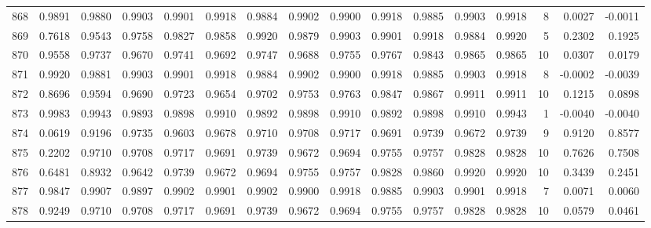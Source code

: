\begin{tabular}{lrrrrrrrrrrrrrrr}
868 &      0.9891 &  0.9880 &  0.9903 &  0.9901 &  0.9918 &  0.9884 &  0.9902 &  0.9900 &  0.9918 &  0.9885 &   0.9903 &     0.9918 &      8 &                    0.0027 &                    -0.0011 \\
869 &      0.7618 &  0.9543 &  0.9758 &  0.9827 &  0.9858 &  0.9920 &  0.9879 &  0.9903 &  0.9901 &  0.9918 &   0.9884 &     0.9920 &      5 &                    0.2302 &                     0.1925 \\
870 &      0.9558 &  0.9737 &  0.9670 &  0.9741 &  0.9692 &  0.9747 &  0.9688 &  0.9755 &  0.9767 &  0.9843 &   0.9865 &     0.9865 &     10 &                    0.0307 &                     0.0179 \\
871 &      0.9920 &  0.9881 &  0.9903 &  0.9901 &  0.9918 &  0.9884 &  0.9902 &  0.9900 &  0.9918 &  0.9885 &   0.9903 &     0.9918 &      8 &                   -0.0002 &                    -0.0039 \\
872 &      0.8696 &  0.9594 &  0.9690 &  0.9723 &  0.9654 &  0.9702 &  0.9753 &  0.9763 &  0.9847 &  0.9867 &   0.9911 &     0.9911 &     10 &                    0.1215 &                     0.0898 \\
873 &      0.9983 &  0.9943 &  0.9893 &  0.9898 &  0.9910 &  0.9892 &  0.9898 &  0.9910 &  0.9892 &  0.9898 &   0.9910 &     0.9943 &      1 &                   -0.0040 &                    -0.0040 \\
874 &      0.0619 &  0.9196 &  0.9735 &  0.9603 &  0.9678 &  0.9710 &  0.9708 &  0.9717 &  0.9691 &  0.9739 &   0.9672 &     0.9739 &      9 &                    0.9120 &                     0.8577 \\
875 &      0.2202 &  0.9710 &  0.9708 &  0.9717 &  0.9691 &  0.9739 &  0.9672 &  0.9694 &  0.9755 &  0.9757 &   0.9828 &     0.9828 &     10 &                    0.7626 &                     0.7508 \\
876 &      0.6481 &  0.8932 &  0.9642 &  0.9739 &  0.9672 &  0.9694 &  0.9755 &  0.9757 &  0.9828 &  0.9860 &   0.9920 &     0.9920 &     10 &                    0.3439 &                     0.2451 \\
877 &      0.9847 &  0.9907 &  0.9897 &  0.9902 &  0.9901 &  0.9902 &  0.9900 &  0.9918 &  0.9885 &  0.9903 &   0.9901 &     0.9918 &      7 &                    0.0071 &                     0.0060 \\
878 &      0.9249 &  0.9710 &  0.9708 &  0.9717 &  0.9691 &  0.9739 &  0.9672 &  0.9694 &  0.9755 &  0.9757 &   0.9828 &     0.9828 &     10 &                    0.0579 &                     0.0461 \\

\end{tabular}
